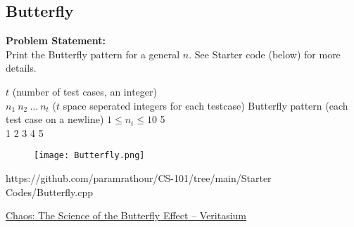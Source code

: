\documentclass[../../Problems]{subfiles}
\begin{document}
\subsection{Butterfly}{\label{pp:butterfly}}
\textbf{Problem Statement:}\\
Print the Butterfly pattern for a general $n$. See Starter code (below) for more details.
\begin{testcases}
	{$t$ \hfill(number of test cases, an integer)\\
	$n_1\ n_2\ \ldots\ n_t$ \hfill($t$ space seperated integers for each testcase)}
	{Butterfly pattern \hfill(each test case on a newline)}
	{$1 \leq n_i \leq 10$}
	{5\\1 2 3 4 5}
	{\vspace{-2em}
	\begin{figure}[H]
	\texttt{[image: Butterfly.png]}
	\end{figure}
	}
	{https://github.com/paramrathour/CS-101/tree/main/Starter Codes/Butterfly.cpp}
\end{testcases}
\begin{funvideo}
\href{https://youtu.be/fDek6cYijxI}{Chaos: The Science of the Butterfly Effect -- Veritasium}
\end{funvideo}
\end{document}
